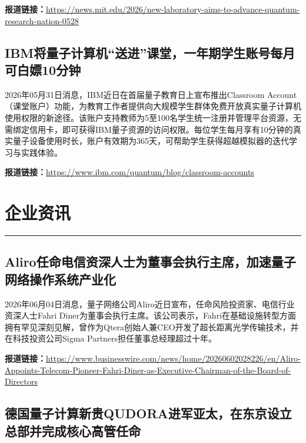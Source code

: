 \documentclass[12pt,a4paper]{ctexart}
\begin{document}
\noindent\textbf{报道链接：}\url{https://news.mit.edu/2026/new-laboratory-aims-to-advance-quantum-research-nation-0528}

\subsection{ IBM将量子计算机“送进”课堂，一年期学生账号每月可白嫖10分钟 }

2026年05月31日消息，IBM近日在首届量子教育日上宣布推出Classroom Account（课堂账户）功能，为教育工作者提供向大规模学生群体免费开放真实量子计算机使用权限的新途径。该账户支持教师为5至100名学生统一注册并管理平台资源，无需绑定信用卡，即可获得IBM量子资源的访问权限。每位学生每月享有10分钟的真实量子设备使用时长，账户有效期为365天，可帮助学生获得超越模拟器的迭代学习与实践体验。

\noindent\textbf{报道链接：}\url{https://www.ibm.com/quantum/blog/classroom-accounts}




\newpage
\section{企业资讯}
\vspace{-0.5em}
\noindent\rule{\linewidth}{1.5pt}

\subsection{ Aliro任命电信资深人士为董事会执行主席，加速量子网络操作系统产业化 }

2026年06月04日消息，量子网络公司Aliro近日宣布，任命风险投资家、电信行业资深人士Fahri Diner为董事会执行主席。该公司表示，Fahri在基础设施转型方面拥有罕见深刻见解，曾作为Qtera创始人兼CEO开发了超长距离光学传输技术，并在科技投资公司Sigma Partners担任董事总经理超过十年。

\noindent\textbf{报道链接：}\url{https://www.businesswire.com/news/home/20260602028226/en/Aliro-Appoints-Telecom-Pioneer-Fahri-Diner-as-Executive-Chairman-of-the-Board-of-Directors}

\subsection{ 德国量子计算新贵QUDORA进军亚太，在东京设立总部并完成核心高管任命 }
\end{document}
